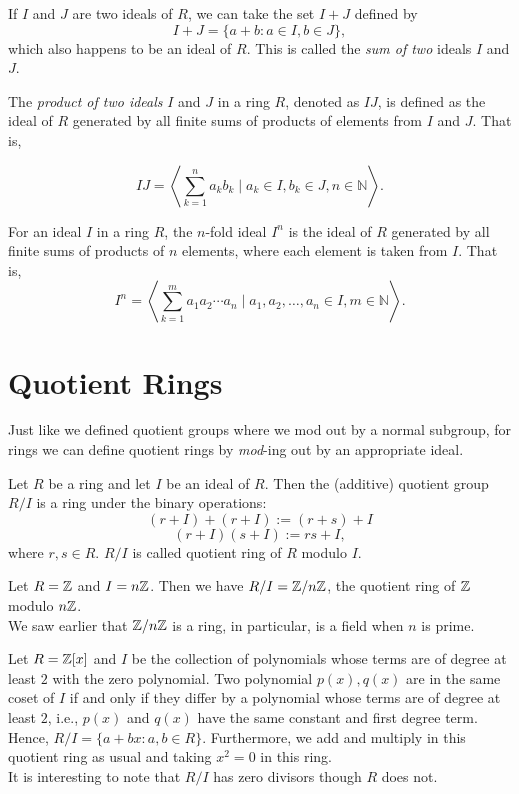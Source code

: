 \begin{eg}
    If $I$ and $J$ are two ideals of $R$, we can take the set $I + J$ defined by
    \[
    I + J = \{a + b: a \in I, b \in J\},
    \]
    which also happens to be an ideal of $R$. This is called the \textit{sum of two} ideals $I$ and $J$.
\end{eg}
\begin{eg}
    The \textit{product of two ideals} \(I\) and \(J\) in a ring \(R\), denoted as \(IJ\), is defined as the ideal of $R$ generated by all finite sums of products of elements from \(I\) and \(J\). That is,

    \[
    IJ = \left\langle \sum_{k=1}^n a_k b_k \mid a_k \in I, b_k \in J, n \in \mathbb{N} \right\rangle.
    \]
\end{eg}
\begin{eg}
    For an ideal \(I\) in a ring \(R\), the \(n\)-fold ideal \(I^n\) is the ideal of $R$ generated by all finite sums of products of \(n\) elements, where each element is taken from \(I\). That is,
    \[
    I^n = \left\langle \sum_{k=1}^m a_1 a_2 \cdots a_n \mid a_1, a_2, \dots, a_n \in I, m \in \mathbb{N} \right\rangle.
    \]
\end{eg}
\section{Quotient Rings}
Just like we defined quotient groups where we mod out by a normal subgroup, for rings we can define quotient rings by \textit{mod}-ing out by an appropriate ideal.
\begin{definition}
    Let $R$ be a ring and let $I$ be an ideal of $R$. Then the (additive) quotient group $R/I$ is a ring under the binary operations:
    \[(r + I) + (r + I) := (r + s) + I\]
    \[(r + I) (s + I) := rs + I,\]
    where $r, s \in R$. $R/I$ is called quotient ring of $R$ modulo $I$.
\end{definition}
\begin{eg}
    Let $R = \mathbb{Z}$ and $I = n\mathbb{Z}$. Then we have $R/I = \mathbb{Z}/n\mathbb{Z}$, the quotient ring of $\mathbb{Z}$ modulo $n\mathbb{Z}$.\\
    We saw earlier that $\mathbb{Z}/n\mathbb{Z}$ is a ring, in particular, is a field when $n$ is prime. 
\end{eg}
\begin{eg}
    Let $R = \mathbb{Z}[x]$ and $I$ be the collection of polynomials whose terms are of degree at least $2$ with the zero polynomial. Two polynomial $p(x), q(x)$ are in the same coset of $I$ if and only if they differ by a polynomial whose terms are of degree at least $2$, i.e., $p(x)$ and $q(x)$ have the same constant and first degree term. Hence, $R/I = \{a + bx: a, b \in R\}$. Furthermore, we add and multiply in this quotient ring as usual and taking $x^2 = 0$ in this ring.\\
    It is interesting to note that $R/I$ has zero divisors though $R$ does not.
\end{eg}
